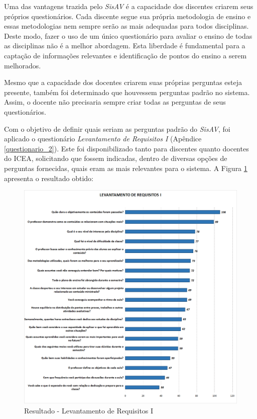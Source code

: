 \documentclass[
  12pt,       %
  openright,      %
  oneside,      %
  a4paper,      %
  english,      %
  french,        %
  spanish,     %
  brazil        %
  ]{abntex2-decsi}
\begin{document}
    Uma das vantagens trazida pelo \textit{SisAV} é a capacidade dos discentes criarem seus próprios questionários. Cada discente segue sua própria metodologia de ensino e essas metodologias nem sempre serão as mais adequadas para todos disciplinas. Deste modo, fazer o uso de um único questionário para avaliar o ensino de todas as disciplinas não é a melhor abordagem. Esta liberdade é fundamental para a captação de informações relevantes e identificação de pontos do ensino a serem melhorados. 

    Mesmo que a capacidade dos docentes criarem suas próprias perguntas esteja presente, também foi determinado que houvessem perguntas padrão no sistema. Assim, o docente não precisaria sempre criar todas as perguntas de seus questionários.

    Com o objetivo de definir quais seriam as perguntas padrão do \textit{SisAV}, foi aplicado o questionário \textit{Levantamento de Requisitos I} (Apêndice \ref{questionario_2}). Este foi disponibilizado tanto para discentes quanto docentes do ICEA, solicitando que fossem indicadas, dentro de diversas opções de perguntas fornecidas, quais eram as mais relevantes para o sistema. A Figura \ref{fig:req_1} apresenta o resultado obtido:

		\begin{figure}[h]	
           \centering
           \caption{Resultado - Levantamento de Requisitos I}						   \label{fig:req_1}
           \includegraphics[width=1\textwidth]{img/req_111}
        \end{figure}
        
\end{document}
